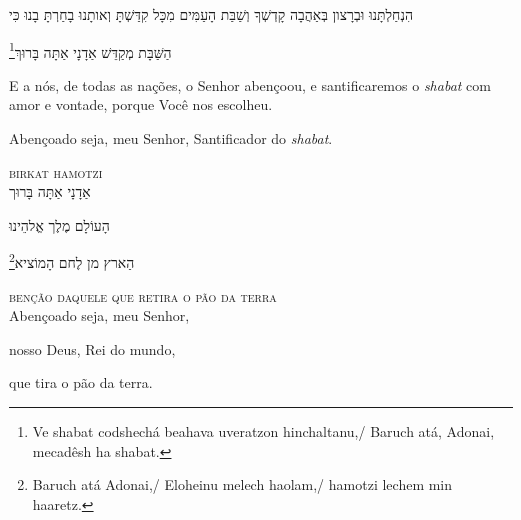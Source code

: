 הִנְחַלְתָּנוּ וּבְרָצון בְּאַהֲבָה קָדְשְׁךָ וְשַׁבַּת הָעַמִּים מִכָּל קִדַּשְׁתָּ וְאותָנוּ בָחַרְתָּ בָנוּ כִּי
\medskip

\footnote{Ve shabat codshechá beahava uveratzon hinchaltanu,/
Baruch atá, Adonai, mecadêsh ha shabat.}הַשַּׁבָּת מְקַדֵּשׁ אַדָנָי אַתָּה בָּרוּךְ

\movetooddpage
\raggedright

\vspace*{1cm}

E a nós, de todas as nações, o Senhor abençoou, e santificaremos o \textit{shabat} com amor e vontade, porque 
Você nos escolheu.\medskip

Abençoado seja, meu Senhor, Santificador do \textit{shabat}.

\movetoevenpage
\raggedleft


\vspace*{1cm}

\textsc{birkat hamotzi}\\[15pt]

אַדָנָי אַתָּה בָּרוּך

הָעוֹלָם מֶלֶך אֱלהֵינוּ 

\footnote{Baruch atá Adonai,/ Eloheinu melech haolam,/ hamotzi lechem min haaretz.}הַארץ מן לֶחם הָמוֹציא

\movetooddpage
\raggedright


\textsc{benção daquele que retira o pão da terra}\\[15pt]

Abençoado seja, meu Senhor,

nosso Deus, Rei do mundo,

que tira o pão da terra.

